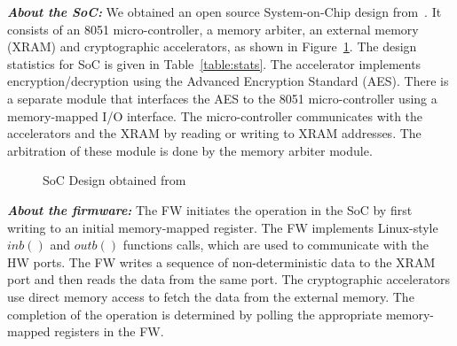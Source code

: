 \documentclass[sigconf]{acmart}
\begin{document}
\textbf{\emph{About the SoC:}}
%
We obtained an open source System-on-Chip design
from~\cite{DBLP:conf/fmcad/SubramanyanVRM15}.  It consists of an 8051
micro-controller, a memory arbiter, an external memory (XRAM) and
cryptographic accelerators, as shown in Figure~\ref{fig:soc}.  
The design statistics for SoC is given in
Table~\ref{table:stats}.  The accelerator implements encryption/decryption 
using the Advanced Encryption Standard (AES).  There is a separate 
module that interfaces the AES to the 8051 micro-controller using 
a memory-mapped I/O interface.  The micro-controller communicates 
with the accelerators and the XRAM by reading or writing to 
XRAM addresses.  The arbitration of these module is done by 
the memory arbiter module. \\ 
%
\begin{figure}[t]
  \caption{SoC Design obtained from~\cite{DBLP:conf/fmcad/SubramanyanVRM15}
\label{fig:soc}}
\end{figure}
%
\textbf{\emph{About the firmware:}}
%
The FW initiates the operation in the SoC by first writing to an
initial memory-mapped register.  The FW implements Linux-style $inb()$
and $outb()$ functions calls, which are used to communicate with the HW
ports.  The FW writes a sequence of non-deterministic data to the XRAM
port and then reads the data from the same port.  The cryptographic
accelerators use direct memory access to fetch the data from the external
memory.  The completion of the operation is determined by polling the
appropriate memory-mapped registers in the FW. \\
%
\end{document}
